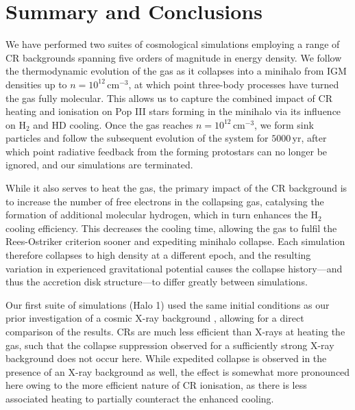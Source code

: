 \documentclass{thesis}
\newcommand{\cc}{\ensuremath{\,\mathrm{cm}^{-3}}\xspace}
\newcommand{\yr}{\ensuremath{\,\mathrm{yr}}\xspace}
\newcommand{\htwo}{\ensuremath{\mathrm{H}_2}\xspace}
\newcommand{\hd}{\ensuremath{\mathrm{HD}}\xspace}
\begin{document}
\section{Summary and Conclusions}
\label{conclusions}

We have performed two suites of cosmological simulations employing a range of CR backgrounds spanning five orders of magnitude in energy density. 
We follow the thermodynamic evolution of the gas as it collapses into a minihalo from IGM densities up to $n=10^{12}\cc$, at which point three-body processes have turned the gas fully molecular. 
This allows us to capture the combined impact of CR heating and ionisation on Pop III stars forming in the minihalo via its influence on $\htwo$ and $\hd$ cooling.
Once the gas reaches $n=10^{12}\cc$, we form sink particles and follow the subsequent evolution of the system for $5000\yr$, after which point radiative feedback from the forming protostars can no longer be ignored, and our simulations are terminated.

While it also serves to heat the gas, the primary impact of the CR background is to increase the number of free electrons in the collapsing gas, catalysing the formation of additional molecular hydrogen, which in turn enhances the $\htwo$ cooling efficiency.  
This decreases the cooling time, allowing the gas to fulfil the Rees-Ostriker criterion sooner and expediting minihalo collapse. 
Each simulation therefore collapses to high density at a different epoch, and the resulting variation in experienced gravitational potential causes the collapse history---and thus the accretion disk structure---to differ greatly between simulations.

Our first suite of simulations (Halo 1) used the same initial conditions as our prior investigation of a cosmic X-ray background \citep{Hummeletal2015}, allowing for a direct comparison of the results.
CRs are much less efficient than X-rays at heating the gas, such that the collapse suppression observed for a sufficiently strong X-ray background does not occur here.  
While expedited collapse is observed in the presence of an X-ray background as well, the effect is somewhat more pronounced here owing to the more efficient nature of CR ionisation, as there is less associated heating to partially counteract the enhanced cooling.
\end{document}
